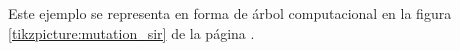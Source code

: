 Este ejemplo se representa en forma de árbol computacional en la figura \ref{tikzpicture:mutation_sir} de la página \pageref{tikzpicture:mutation_sir}.

\begin{center}






\end{center}
